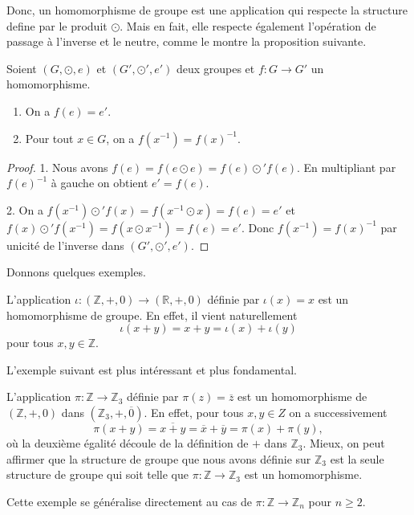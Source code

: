\documentclass[french,course,oneside,theoremnosection]{lecture}
\newcommand{\R}{\mathbb{R}}
\newcommand{\Z}{\mathbb{Z}}
\begin{document}
Donc, un homomorphisme de groupe est une application qui respecte la structure define par le produit $\odot$. Mais en fait, elle respecte également l'opération de passage à l'inverse et le neutre, comme le montre la proposition suivante.

\begin{proposition}
Soient $(G,\odot, e)$ et $(G', \odot',  e')$ deux groupes et $f\colon G \to G'$ un homomorphisme. 
\begin{enumerate}
\item On a $f(e)=e'$.
\item Pour tout $x \in G$, on a $f(x^{-1})=f(x)^{-1}$.
\end{enumerate}
\end{proposition}

\begin{proof}
1. Nous avons $f(e)=f(e \odot e)=f(e) \odot' f(e)$. En multipliant par $f(e)^{-1}$ à gauche on obtient $e'=f(e)$.

2. On a $f(x^{-1})  \odot' f(x)= f(x^{-1} \odot x) = f(e)=e'$ et $f(x)  \odot' f(x^{-1})= f(x \odot x^{-1}) = f(e)=e'$. Donc $f(x^{-1})=f(x)^{-1}$ par unicité de l'inverse dans $(G', \odot',  e')$.
\end{proof}

Donnons quelques exemples.

\begin{example}
L'application $\iota \colon (\Z, +,  0) \to (\R, +,  0)$ définie par $\iota(x)=x$ est un homomorphisme de groupe. En effet, il vient naturellement
\[
\iota (x+y) = x+y = \iota(x) + \iota (y)
\]
pour tous $x,y \in \Z$.
\end{example}

L'exemple suivant est plus intéressant et plus fondamental.

\begin{example}\label{ex:3642}
L'application $\pi\colon \Z \to \Z_3$ définie par $\pi(z)=\overline{z}$ est un homomorphisme de $(\Z, +,  0 )$ dans $(\Z_3, +, \overline{0})$. En effet, pour tous $x,y \in Z$ on a successivement
\[
\pi(x+y)=\overline{x+y}=\overline{x}+\overline{y}=\pi(x)+\pi(y),
\]
où la deuxième égalité découle de la définition de $+$ dans $\Z_3$. Mieux, on peut affirmer que la structure de groupe que nous avons définie sur $\Z_3$ est la seule structure de groupe qui soit telle que $\pi\colon \Z \to \Z_3$ est un homomorphisme.

Cette exemple se généralise directement au cas de $\pi \colon \Z \to \Z_n$ pour $n \geq 2$.
\end{example}
\end{document}
